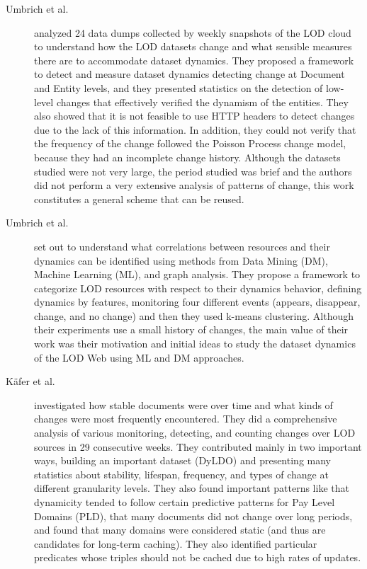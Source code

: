 \documentclass[sw]{iosart2x}
\begin{document}

	\begin{description}
	\item[Umbrich et al. \cite{UmbrichHHPD10}]  analyzed 24 data dumps collected by weekly snapshots of the LOD cloud to understand how the LOD datasets change and what sensible measures there are to accommodate dataset dynamics. They proposed a framework to detect and measure dataset dynamics detecting change at Document and Entity levels, and they presented statistics on the detection of low-level changes that effectively verified the dynamism of the entities. They also showed that it is not feasible to use HTTP headers to detect changes due to the lack of this information. In addition, they could not verify that the frequency of the change followed the Poisson Process change model, because they had an incomplete change history. Although the datasets studied were not very large, the period studied was brief and the authors did not perform a very extensive analysis of patterns of change, this work constitutes a general scheme that can be reused.
	
	\item[Umbrich et al. \cite{UmbrichKL10}] set out to understand what correlations between resources and their dynamics can be identified using methods from Data Mining (DM), Machine Learning (ML), and graph analysis. They propose a framework to categorize LOD resources with respect to their dynamics behavior, defining dynamics by features, monitoring four different events (appears, disappear, change, and no change) and then they used k-means clustering. Although their experiments use a small history of changes, the main value of their work was their motivation and initial ideas to study the dataset dynamics of the LOD Web using ML and DM approaches.
	
	\item[K{\"{a}}fer et al. \cite{KaferAUOH13}] investigated how stable documents were over time and what kinds of changes were most frequently encountered. They did a comprehensive analysis of various monitoring, detecting, and counting changes over LOD sources in 29 consecutive weeks. They contributed mainly in two important ways, building an important dataset (DyLDO) and presenting many statistics about stability, lifespan, frequency, and types of change at different granularity levels. They also found important patterns like that dynamicity tended to follow certain predictive patterns for Pay Level Domains (PLD), that many documents did not change over long periods, and found that many domains were considered static (and thus are candidates for long-term caching). They also identified particular predicates whose triples should not be cached due to high rates of updates.
	

\end{description}
\end{document}
